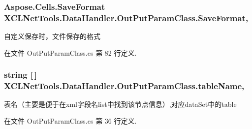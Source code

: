 \hypertarget{class_x_c_l_net_tools_1_1_data_handler_1_1_out_put_param_class_a0557dded3644a3e7bfa850c11624f015}{
\subsubsection[{Save\-Format}]{\setlength{\rightskip}{0pt plus 5cm}Aspose.\-Cells.\-Save\-Format X\-C\-L\-Net\-Tools.\-Data\-Handler.\-Out\-Put\-Param\-Class.\-Save\-Format\hspace{0.3cm}{\ttfamily [get]}, {\ttfamily [set]}}}\label{class_x_c_l_net_tools_1_1_data_handler_1_1_out_put_param_class_a0557dded3644a3e7bfa850c11624f015}


自定义保存时，文件保存的格式 



在文件 Out\-Put\-Param\-Class.\-cs 第 82 行定义.

\hypertarget{class_x_c_l_net_tools_1_1_data_handler_1_1_out_put_param_class_a7da1f957b459cb7fa6e6adcdbdaec714}{
\subsubsection[{table\-Name}]{\setlength{\rightskip}{0pt plus 5cm}string \mbox{[}$\,$\mbox{]} X\-C\-L\-Net\-Tools.\-Data\-Handler.\-Out\-Put\-Param\-Class.\-table\-Name\hspace{0.3cm}{\ttfamily [get]}, {\ttfamily [set]}}}\label{class_x_c_l_net_tools_1_1_data_handler_1_1_out_put_param_class_a7da1f957b459cb7fa6e6adcdbdaec714}


表名（主要是便于在xml字段名list中找到该节点信息）,对应data\-Set中的table 



在文件 Out\-Put\-Param\-Class.\-cs 第 36 行定义.

